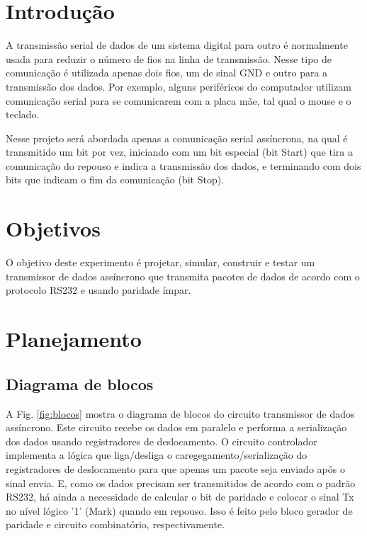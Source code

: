 \documentclass[a4,12pt]{horizon-theme}
\begin{document}
\horizonCover

\horizonTitle


\section{Introdução} %

A transmissão serial de dados de um sistema digital para outro é normalmente usada para reduzir o número de fios na linha de transmissão. Nesse tipo de comunicação é utilizada apenas dois fios, um de sinal GND e outro para a transmissão dos dados. Por exemplo, alguns periféricos do computador utilizam comunicação serial para se comunicarem com a placa mãe, tal qual o mouse e o teclado.

Nesse projeto será abordada apenas a comunicação serial assíncrona, na qual é transmitido um bit por vez, iniciando com um bit especial (bit Start) que tira a comunicação do repouso e indica a transmissão dos dados, e terminando com dois bits que indicam o fim da comunicação (bit Stop).

\section{Objetivos} %
O objetivo deste experimento é projetar, simular, construir e testar um transmissor de dados assíncrono que transmita pacotes de dados de acordo com o protocolo RS232 e usando paridade ímpar.



\section{Planejamento} %
\label{sec:plan}

\subsection{Diagrama de blocos}
\label{sec:blocos}
A Fig. \ref{fig:blocos} mostra o diagrama de blocos do circuito transmissor de dados assíncrono. Este circuito recebe os dados em paralelo e performa a serialização dos dados usando registradores de deslocamento. O circuito controlador implementa a lógica que liga/desliga o caregegamento/serialização do registradores de deslocamento para que apenas um pacote seja enviado após o sinal envia. E, como os dados precisam ser transmitidos de acordo com o padrão RS232, há ainda a necessidade de calcular o bit de paridade e colocar o sinal Tx no nível lógico '1' (Mark) quando em repouso. Isso é feito pelo bloco gerador de paridade e circuito combinatório, respectivamente. 
\end{document}
